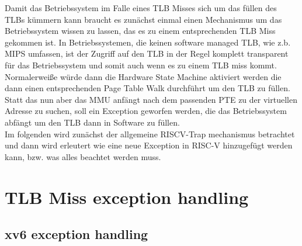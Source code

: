 Damit das Betriebssystem im Falle eines TLB Misses sich um das füllen des TLBs kümmern kann
braucht es zunächst einmal einen Mechanismus um das Betriebssystem wissen zu lassen,
das es zu einem entsprechenden TLB Miss gekommen ist. In Betriebssystemen, die keinen
software managed TLB, wie z.b. MIPS \cite{MIPSArchitectureProgrammers2016} umfassen, ist der
Zugriff auf den TLB in der Regel komplett transparent für das Betriebssystem und somit auch wenn
es zu einem TLB miss kommt. Normalerweiße würde dann die Hardware State Machine aktiviert werden
die dann einen entsprechenden Page Table Walk durchführt um den TLB zu füllen.
Statt das nun aber das MMU anfängt nach dem passenden PTE zu der virtuellen Adresse zu suchen,
soll ein Exception geworfen werden, die das Betriebssystem abfängt um den TLB dann in Software
zu füllen.\\
Im folgenden wird zunächst der allgemeine RISCV-Trap mechanismus betrachtet und dann
wird erleutert wie eine neue Exception in RISC-V hinzugefügt werden kann, bzw. was alles beachtet
werden muss.


\section{TLB Miss exception handling}
\subsection{xv6 exception handling}

%
